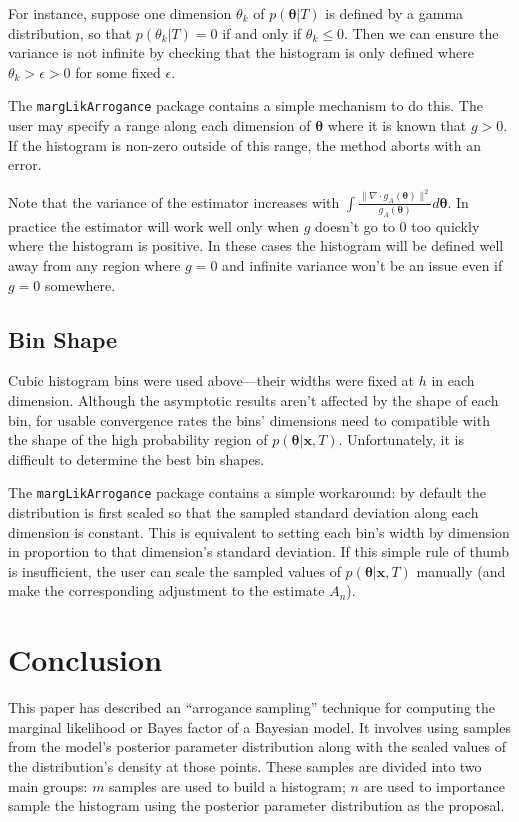 \documentclass[letterpaper,12pt]{article}
\newcommand{\bx}{\boldsymbol x}
\newcommand{\btheta}{\boldsymbol \theta}
\newcommand{\norm}[1]{\lVert#1\rVert}
\begin{document}
For instance, suppose one dimension $\theta_k$ of $p(\btheta|T)$ is
defined by a gamma distribution, so that $p(\theta_k|T) = 0$ if and
only if $\theta_k \leq 0$.  Then we can ensure the variance is not
infinite by checking that the histogram is only defined where
$\theta_k > \epsilon > 0$ for some fixed $\epsilon$.

The \texttt{margLikArrogance} package contains a simple mechanism to
do this.  The user may specify a range along each dimension of
$\btheta$ where it is known that $g > 0$.  If the histogram is
non-zero outside of this range, the method aborts with an error.

Note that the variance of the estimator increases with $\int
\frac{\norm{\nabla \cdot g_A(\btheta)}^2}{g_A(\btheta)} d\btheta$.  In
practice the estimator will work well only when $g$ doesn't go to 0
too quickly where the histogram is positive.  In these cases the
histogram will be defined well away from any region where $g=0$ and
infinite variance won't be an issue even if $g=0$ somewhere.


\subsection{Bin Shape}

Cubic histogram bins were used above---their widths were fixed at $h$
in each dimension.  Although the asymptotic results aren't affected by
the shape of each bin, for usable convergence rates the bins'
dimensions need to compatible with the shape of the high probability
region of $p(\btheta|\bx, T)$.  Unfortunately, it is difficult to
determine the best bin shapes.

The \texttt{margLikArrogance} package contains a simple workaround: by
default the distribution is first scaled so that the sampled standard
deviation along each dimension is constant.  This is equivalent to
setting each bin's width by dimension in proportion to that
dimension's standard deviation.  If this simple rule of thumb is
insufficient, the user can scale the sampled values of $p(\btheta|\bx,
T)$ manually (and make the corresponding adjustment to the estimate
$A_n$).


\section{Conclusion}

This paper has described an ``arrogance sampling'' technique for
computing the marginal likelihood or Bayes factor of a Bayesian model.
It involves using samples from the model's posterior parameter
distribution along with the scaled values of the distribution's
density at those points.  These samples are divided into two main
groups: $m$ samples are used to build a histogram; $n$ are used to
importance sample the histogram using the posterior parameter
distribution as the proposal.
\end{document}
